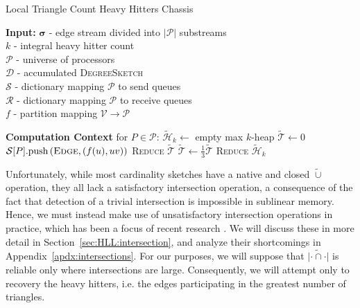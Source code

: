 \documentclass{vldb}
\newcommand{\push}[1]{\text{push} \left ( #1 \right )}
\newcommand{\algoname}[1]{\textnormal{\textsc{#1}}}
\begin{document}
\begin{algorithm} [t]
\caption{Local Triangle Count Heavy Hitters Chassis}\label{alg:ds:chassis}
\begin{flushleft}
        \textbf{Input:} 		$\boldsymbol{\sigma}$ - edge stream divided into $|\mathcal{P}|$ substreams\\
        	\hspace{3.2em}	$k$ - integral heavy hitter count	 \\
        	\hspace{3.2em}	$\mathcal{P}$ - universe of processors	 \\
        	\hspace{3.2em}	$\mathcal{D}$ - accumulated \algoname{DegreeSketch} 	 \\
        	\hspace{3.2em}	$\mathcal{S}$ - dictionary mapping $\mathcal{P}$ to send queues	 \\
        	\hspace{3.2em}	$\mathcal{R}$ - dictionary mapping $\mathcal{P}$ to receive queues	 \\
        	\hspace{3.2em}	$f$ - partition mapping $\mathcal{V} \rightarrow \mathcal{P}$	 \\
\end{flushleft}
\begin{flushleft}
\begin{algorithmic}[1]
	\Statex \textbf{Computation Context} for $P \in \mathcal{P}$:
		\State $\widetilde{\mathcal{H}}_k \gets $ empty max $k$-heap
		\State $\widetilde{\mathcal{T}} \gets 0$
 			\State $\mathcal{S}[P].\push{\algoname{Edge}, (f(u), uv)}$
		\EndWhile
		\State \algoname{Reduce}  $\widetilde{\mathcal{T}}$
		\State $\widetilde{\mathcal{T}} \gets \frac{1}{3} \widetilde{\mathcal{T}}$
		\State \algoname{Reduce} $\widetilde{\mathcal{H}}_k$
\end{algorithmic}
\end{flushleft}
\end{algorithm}

Unfortunately, while most cardinality sketches have a native and closed $\widetilde{\cup}$ operation, they all lack a satisfactory intersection operation, a consequence of the fact that detection of a trivial intersection is impossible in sublinear memory. 
Hence, we must instead make use of unsatisfactory intersection operations in practice, which has been a focus of recent research \cite{ting2016towards, cohen2017minimal, ertl2017new}.
We will discuss these in more detail in Section~\ref{sec:HLL:intersection}, and analyze their shortcomings in Appendix~\ref{apdx:intersections}.
For our purposes, we will suppose that $\widetilde{| \cdot \cap \cdot|}$ is reliable only where intersections are large.
Consequently, we will attempt only to recovery the heavy hitters, i.e. the edges participating in the greatest number of triangles. 
\end{document}
